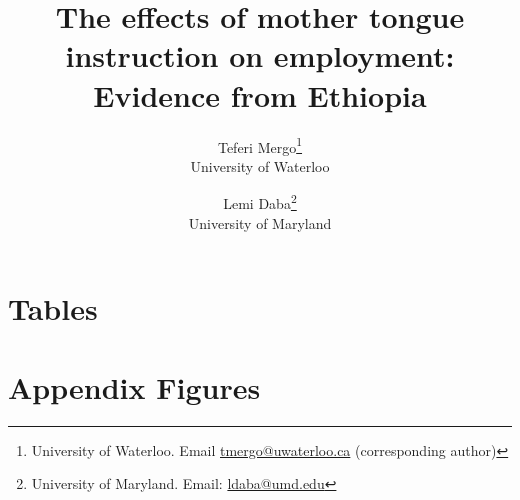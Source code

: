 \documentclass[12pt]{article}
\begin{document}
\begin{titlepage}
\title{The effects of mother tongue instruction on employment: Evidence from Ethiopia}
\author{Teferi Mergo\thanks{University of Waterloo. Email \href{tmergo@uwaterloo.ca}{tmergo@uwaterloo.ca} (corresponding author)} \\ 
University of Waterloo 
    \and Lemi Daba\thanks{University of Maryland. Email: \href{ldaba@umd.edu}{ldaba@umd.edu} } \\
    University of Maryland}    
\date{}
\maketitle 




\setcounter{page}{0}
\thispagestyle{empty}
\end{titlepage}
\pagebreak \newpage

\doublespacing










\pagebreak

\singlespacing





\clearpage

\onehalfspacing

\section*{Tables} \label{sec:tab}



% 

% 

% 




\clearpage



\clearpage

\section*{Appendix Figures} \label{sec:appendixa}
\end{document}
